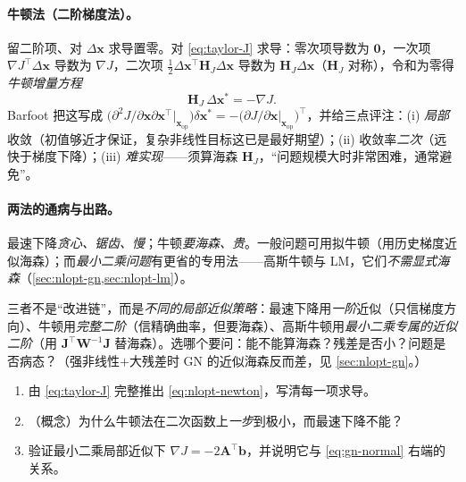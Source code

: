 \paragraph{牛顿法（二阶梯度法）。}
留二阶项、对 $\Delta\mathbf{x}$ 求导置零。对 \cref{eq:taylor-J} 求导：零次项导数为 $\mathbf{0}$，一次项 $\nabla J^\top\Delta\mathbf{x}$ 导数为 $\nabla J$，二次项 $\tfrac12\Delta\mathbf{x}^\top\mathbf{H}_J\Delta\mathbf{x}$ 导数为 $\mathbf{H}_J\Delta\mathbf{x}$（$\mathbf{H}_J$ 对称），令和为零得\emph{牛顿增量方程}
\begin{equation}
  \mathbf{H}_J\,\Delta\mathbf{x}^*=-\nabla J.
  \label{eq:nlopt-newton}
\end{equation}
Barfoot\cite{barfoot2024state} 把这写成 $\big(\partial^2 J/\partial\mathbf{x}\partial\mathbf{x}^\top\big|_{\mathbf{x}_{\mathrm{op}}}\big)\delta\mathbf{x}^*=-\big(\partial J/\partial\mathbf{x}\big|_{\mathbf{x}_{\mathrm{op}}}\big)^\top$，并给三点评注：(i) \emph{局部}收敛（初值够近才保证，复杂非线性目标这已是最好期望）；(ii) 收敛率\emph{二次}（远快于梯度下降）；(iii) \emph{难实现}——须算海森 $\mathbf{H}_J$，“问题规模大时非常困难，通常避免”\cite{gaoxiang2019slam14,barfoot2024state}。

\paragraph{两法的通病与出路。}\cite{gaoxiang2019slam14}
最速下降\emph{贪心、锯齿、慢}；牛顿\emph{要海森、贵}。一般问题可用拟牛顿（用历史梯度近似海森）；而\emph{最小二乘问题}有更省的专用法——高斯牛顿与 LM，它们\emph{不需显式海森}（\cref{sec:nlopt-gn,sec:nlopt-lm}）。

\begin{pitfall}
三者不是“改进链”，而是\emph{不同的局部近似策略}：最速下降用\emph{一阶}近似（只信梯度方向）、牛顿用\emph{完整二阶}（信精确曲率，但要海森）、高斯牛顿用\emph{最小二乘专属的近似二阶}（用 $\mathbf{J}^\top\mathbf{W}^{-1}\mathbf{J}$ 替海森）。选哪个要问：能不能算海森？残差是否小？问题是否病态？（强非线性$+$大残差时 GN 的近似海森反而差，见 \cref{sec:nlopt-gn}。）
\end{pitfall}

\begin{practice}
\begin{enumerate}
  \item 由 \cref{eq:taylor-J} 完整推出 \cref{eq:nlopt-newton}，写清每一项求导。
  \item （概念）为什么牛顿法在二次函数上\emph{一步}到极小，而最速下降不能？
  \item 验证最小二乘局部近似下 $\nabla J=-2\mathbf{A}^\top\mathbf{b}$，并说明它与 \cref{eq:gn-normal} 右端的关系。
\end{enumerate}
\end{practice}

